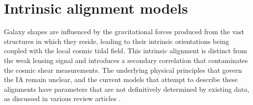 \section{Intrinsic alignment models}
 \label{sec:IA_th}

 
Galaxy shapes are influenced by the gravitational forces produced from the vast structures in which they reside, leading to their intrinsic orientations being coupled with the local cosmic tidal field.
This  intrinsic alignment is distinct from the weak lensing signal and introduces a secondary correlation that contaminates the cosmic shear measurements.
The underlying physical principles that govern the IA remain unclear, and the current models that attempt to describe these alignments have parameters that are not definitively determined by existing data, as discussed in various review articles \citep[see][]{Joachimi_IA_review_2015, Kirk_IA_review_2015, Troxel_IA_review_2015, Kiessling_IA_review_2015}.
 

